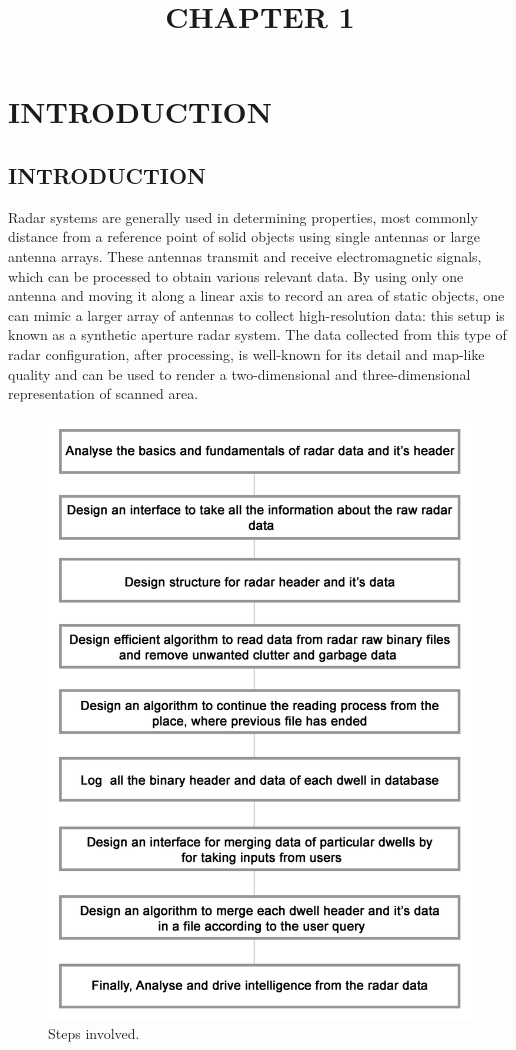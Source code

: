 \documentclass[14pt]{article} %
\date{}
\begin{document}
 \tableofcontents
\listoffigures

\title{\huge {CHAPTER 1}}
\maketitle
\section{\huge{INTRODUCTION}}


\subsection{INTRODUCTION}
         Radar systems are generally used in determining properties, most commonly distance from a reference point of solid objects using single antennas or large antenna arrays. These antennas transmit and receive electromagnetic signals, which can be processed to obtain various relevant data. By using only one antenna and moving it along a linear axis to record an area of static objects, one can mimic a larger array of antennas to collect high-resolution data: this setup is known as a synthetic aperture radar system. The data collected from this type of radar configuration, after processing, is well-known for its detail and map-like quality and can be used to render a two-dimensional and three-dimensional representation of scanned area.
         
 \begin{figure}[t]
 \centering
 \includegraphics[width=0.8\linewidth]{steps.png}
  \caption{Steps involved.}
  \label{fig:figure 1}
\end{figure}
\end{document}

